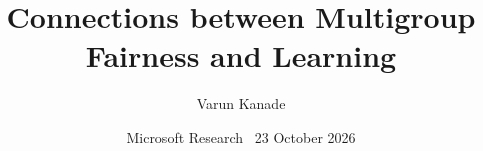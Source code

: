 \newcommand{\noisysample}{%
  \draw[space] (0,0) ellipse (2.2 and 1.5);
  \node[lab] at (2.1,1.45) {$\X$};
  \foreach \x/\y in {-1.5/0.3, -1.2/-0.5, -0.9/0.8, -0.7/-0.1,
                     -1.6/-0.2, -0.4/0.5, -0.2/-0.8, 0.3/0.2,
                     -1.0/0.1, 0.6/-0.4, -0.5/-0.5, 0.9/0.7} {
    \fill[accent] (\x,\y) circle (2.2pt);
  }
  \foreach \x/\y in {1.5/0.2, 1.2/-0.6, 0.8/0.1, 1.0/-0.1,
                     1.6/-0.3, 0.4/0.8, 0.2/-0.3, -0.3/0.1,
                     1.3/0.6, -0.8/-0.7, 0.5/-0.9, -0.6/0.9} {
    \draw[muted, line width=0.8pt] (\x,\y) circle (2.2pt);
  }}
\newcommand{\noisylegend}{%
  {\footnotesize
   \textcolor{accent}{$\bullet$}~$y = 1$ \quad
   \textcolor{muted}{$\circ$}~$y = 0$}}

\makeatletter
\newcommand{\slidelabel}[1]{%
  \ifnum\beamer@slideinframe=1
    \protected@write\@auxout{}{\string\newlabel{slide:#1}{{\insertframenumber}{\thepage}}}%
  \fi}
\makeatother
\newcommand{\slideref}[1]{\ref{slide:#1}}

\let\theslidecite\relax
\newcommand{\slidecite}[1]{\gdef\theslidecite{#1}\ignorespaces}


\title{Connections between Multigroup Fairness and Learning}
\author{Varun Kanade}
\date{Microsoft Research \textperiodcentered\ 23 October 2026}%
